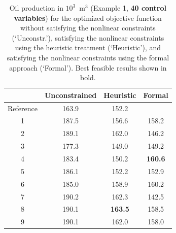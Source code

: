 \documentclass[twocolumn,numbook]{svjour3}          %
\begin{document}
\begin{table}
\centering
\caption{Oil production in $10^3$~m$^3$ (Example 1, {\bf 40 control variables}) for the optimized objective function
         without satisfying the nonlinear constraints (`Unconstr.'), satisfying the nonlinear constraints
         using the heuristic treatment (`Heuristic'), and satisfying the nonlinear constraints
         using the formal approach (`Formal'). Best feasible results shown in bold.}
\begin{tabular}{|c|c|c|c|}
\hline
    & Unconstrained & Heuristic & Formal                       \\
\hline
Reference    & 163.9         &  152.2                      &                           \\
1                     & 187.5         &  156.6                      &        158.2        \\
2                     & 189.1         &  162.0                      &        146.2        \\
3                     & 177.3         &  149.0                      &        149.2        \\
4                     & 183.4         &  150.2                      & \bf{ 160.6 }      \\
5                     & 186.1         &  152.2                      &        152.9        \\
6                     & 185.0         &  158.9                      &        160.2        \\
7                     & 190.2         &  162.3                      &        142.5        \\ 
8                     & 190.1         &\bf{163.5}                 &        158.5        \\
9                     & 190.1         &     162.0                   &        158.0        \\
\hline
\end{tabular}
  \label{table:PiC500Steps8}
\end{table}
\end{document}
